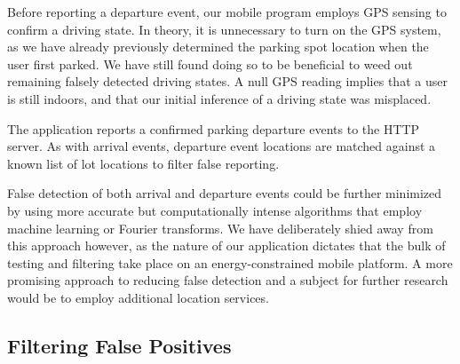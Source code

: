 Before reporting a departure event, our mobile program employs GPS sensing to
confirm a driving state. In theory, it is unnecessary to turn on the GPS
system, as we have already previously determined the parking spot location
when the user first parked. We have still found doing so to be beneficial to
weed out remaining falsely detected driving states. A null GPS reading
implies that a user is still indoors, and that our initial inference of a
driving state was misplaced.

The application reports a confirmed parking departure events to the HTTP
server. As with arrival events, departure event locations are matched against
a known list of lot locations to filter false reporting.

False detection of both arrival and departure events could be further
minimized by using more accurate but computationally intense algorithms that
employ machine learning or Fourier transforms. We have deliberately shied
away from this approach however, as the nature of our application dictates
that the bulk of testing and filtering take place on an energy-constrained
mobile platform. A more promising approach to reducing false detection and a
subject for further research would be to employ additional location services.

\subsection{Filtering False Positives}

